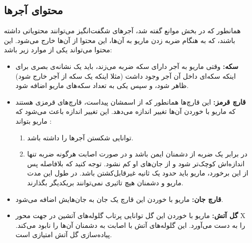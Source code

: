 \documentclass{utap}
\begin{document}
	\subsection{محتوای آجرها}
همانطور که در بخش موانع گفته شد، آجر‌های شگفت‌انگیز می‌توانند محتویاتی داشته باشند، که به هنگام ضربه زدن ماریو به آن‌ها، این محتوا از آن‌ها خارج می‌شود. این محتوا می‌تواند یکی از موارد زیر باشد:
	\begin{itemize}
		\item
\textbf{سکه:}
وقتی ماریو به آجر دارای سکه ضربه می‌زند، باید یک نشانه‌ی بصری برای اینکه سکه‌ای داخل آن آجر وجود داشت (مثلا اینکه یک سکه از آجر خارج شود) ظاهر شود، و سپس یکی به تعداد سکه‌های ماریو اضافه شود.
		\item
\textbf{قارچ قرمز:‌}
این قارچ‌ها همانطور که از اسمشان پیداست، قارچ‌های قرمزی هستند که ماریو با خوردن آن‌ها تغییر اندازه می‌دهد. این تغییر اندازه باعث می‌شود که ماریو بتواند :
		\begin{enumerate}
			\item
توانایی شکستن آجر‌ها را داشته باشد.
			\item
در برابر یک ضربه از دشمنان ایمن باشد و در صورت اصابت هرگونه ضربه تنها اندازه‌اش کوچک‌تر شود و از جان‌های او کم نشود. توجه کنید که بلافاصله پس از این برخورد، ماریو باید حدود یک ثانیه غیرقابل‌کشتن باشد. در طول این مدت ماریو و دشمنان هیچ تاثیری نمی‌توانند بر‌یکدیگر بگذارند.
		\end{enumerate}

		\item
\textbf{قارچ جان:‌}
ماریو با خوردن این قارچ یک جان به جان‌هایش اضافه می‌شود.
		\item
\textbf{گل آتش:}
ماریو با خوردن این گل توانایی پرتاب گلوله‌های آتشین در جهت محور X را به دست می‌آورد. این گلوله‌های آتش با اصابت به دشمنان آن‌ها را نابود می‌کند. پیاده‌سازی گل آتش امتیازی است.
	\end{itemize}
\end{document}
